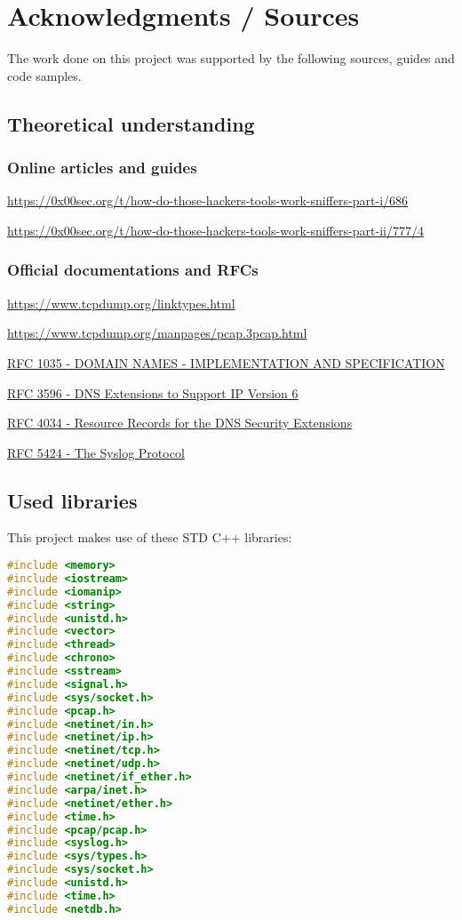 
\section{Acknowledgments / Sources}

The work done on this project was supported by the following sources, guides and code samples.

\subsection{Theoretical understanding}


\subsubsection{Online articles and guides}

\url{https://0x00sec.org/t/how-do-those-hackers-tools-work-sniffers-part-i/686}

\url{https://0x00sec.org/t/how-do-those-hackers-tools-work-sniffers-part-ii/777/4}

\subsubsection{Official documentations and RFCs}

\url{https://www.tcpdump.org/linktypes.html}

\url{https://www.tcpdump.org/manpages/pcap.3pcap.html}

\href{https://www.ietf.org/rfc/rfc1035.txt}{RFC 1035 - DOMAIN NAMES - IMPLEMENTATION AND SPECIFICATION}

\href{https://tools.ietf.org/html/rfc3596}{RFC 3596 - DNS Extensions to Support IP Version 6}

\href{https://www.ietf.org/rfc/rfc4034.txt}{RFC 4034 - Resource Records for the DNS Security Extensions}

\href{https://tools.ietf.org/html/rfc5424}{RFC 5424 - The Syslog Protocol}

\pagebreak

\subsection{Used libraries}

This project makes use of these STD C++ libraries:

\begin{lstlisting}[language=C++] 
#include <memory>
#include <iostream>
#include <iomanip>
#include <string>
#include <unistd.h>
#include <vector>
#include <thread>
#include <chrono>
#include <sstream>
#include <signal.h>
#include <sys/socket.h>
#include <pcap.h>
#include <netinet/in.h>
#include <netinet/ip.h>
#include <netinet/tcp.h>
#include <netinet/udp.h>
#include <netinet/if_ether.h>
#include <arpa/inet.h>
#include <netinet/ether.h> 
#include <time.h>
#include <pcap/pcap.h>
#include <syslog.h>
#include <sys/types.h>
#include <sys/socket.h>
#include <unistd.h>
#include <time.h>
#include <netdb.h>
\end{lstlisting}


